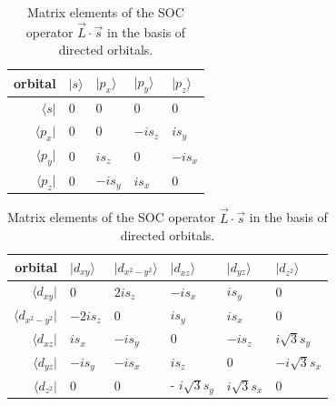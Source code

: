 \begin{table}[h!]
\begin{tabularx}{\textwidth}{|r| X X X X|}
\hline
orbital & $|s \rangle$ & $|p_x \rangle$ & $|p_y \rangle$ & $|p_z \rangle$ \\ \hline
$\langle s|$ & 0 & 0 & 0 & 0 \\
$\langle p_x|$ & 0 & 0 & $- i s_z$ & $i s_y$ \\
$\langle p_y|$ & 0 & $i s_{z} $ & 0 & $- i s_{x} $ \\
$\langle p_z|$ & 0 & $-i s_y$ & $i s_{x} $ & 0 \\
\hline
\end{tabularx}
\newline
\vspace*{0.5 cm}
\newline
\begin{tabularx}{\textwidth}{|r| X X X X X|}
\hline
orbital & $|d_{xy} \rangle$ & $|d_{x^2-y^2}	\rangle$ & $|d_{xz} \rangle$ & $|d_{yz} \rangle$ & $|d_{z^2} \rangle $ \\ \hline
$\langle d_{xy}|$ & 0 & $2 i s_z $ & $-i s_x $ & $i s_y$ & 0\\
$\langle d_{x^2 - y^2}|$ & $-2 i s_z$ & $0$ & $i s_{y} $ & $i s_x $ & 0\\
$\langle d_{xz}|$ & $i s_x$ & $- i s_{y} $ & 0 & $-i s_{z} $ & $i \sqrt{3} s_y$\\
$\langle d_{yz}|$ & $- i s_y $ & $ - i s_x$ & $i s_{z} $ & $0$ & $-i \sqrt{3} s_x $\\
$\langle d_{z^2}|$ & 0 & 0 & - $i \sqrt{3} s_y$ & $i \sqrt{3} s_{x} $ & $0$\\
\hline
\end{tabularx}
\caption{Matrix elements of the SOC operator $\vec{L} \cdot \vec{s}$ in the basis of directed orbitals.}
\label{tab:soc2}
\end{table}